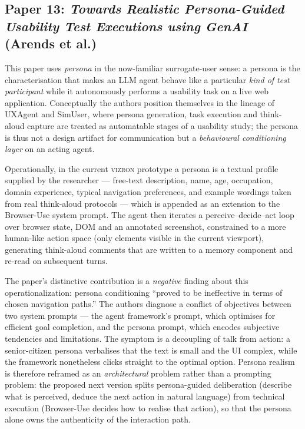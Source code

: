 
\subsection*{Paper 13: \textit{Towards Realistic Persona-Guided Usability Test Executions using GenAI} (Arends et al.)}

This paper uses \emph{persona} in the now-familiar surrogate-user sense: a persona is the
characterisation that makes an LLM agent behave like a particular \emph{kind of test
participant} while it autonomously performs a usability task on a live web application.
Conceptually the authors position themselves in the lineage of UXAgent and SimUser, where
persona generation, task execution and think-aloud capture are treated as automatable stages
of a usability study; the persona is thus not a design artifact for communication but a
\emph{behavioural conditioning layer} on an acting agent.

Operationally, in the current \textsc{vizron} prototype a persona is a textual profile
supplied by the researcher --- free-text description, name, age, occupation, domain
experience, typical navigation preferences, and example wordings taken from real
think-aloud protocols --- which is appended as an extension to the Browser-Use system
prompt. The agent then iterates a perceive--decide--act loop over browser state, DOM and an
annotated screenshot, constrained to a more human-like action space (only elements visible
in the current viewport), generating think-aloud comments that are written to a memory
component and re-read on subsequent turns.

The paper's distinctive contribution is a \emph{negative} finding about this
operationalization: persona conditioning ``proved to be ineffective in terms of chosen
navigation paths.'' The authors diagnose a conflict of objectives between two system
prompts --- the agent framework's prompt, which optimises for efficient goal completion,
and the persona prompt, which encodes subjective tendencies and limitations. The symptom is
a decoupling of talk from action: a senior-citizen persona verbalises that the text is small
and the UI complex, while the framework nonetheless clicks straight to the optimal option.
Persona realism is therefore reframed as an \emph{architectural} problem rather than a
prompting problem: the proposed next version splits persona-guided deliberation (describe
what is perceived, deduce the next action in natural language) from technical execution
(Browser-Use decides how to realise that action), so that the persona alone owns the
authenticity of the interaction path.

